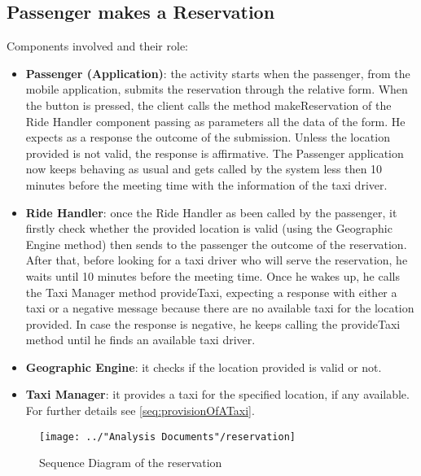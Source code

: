 \subsection{Passenger makes a Reservation}\label{seq:passengerMakesReservation}
Components involved and their role:
\begin{itemize}
	\item \textbf{Passenger (Application)}: the activity starts when the passenger, from the mobile application, submits the reservation through the relative form. When the button is pressed, the client calls the method makeReservation of the Ride Handler component passing as parameters all the data of the form. He expects as a response the outcome of the submission. Unless the location provided is not valid, the response is affirmative. The Passenger application now keeps behaving as usual and gets called by the system less then 10 minutes before the meeting time with the information of the taxi driver.
	\item \textbf{Ride Handler}: once the Ride Handler as been called by the passenger, it firstly check whether the provided location is valid (using the Geographic Engine method) then sends to the passenger the outcome of the reservation. After that, before looking for a taxi driver who will serve the reservation, he waits until 10 minutes before the meeting time. Once he wakes up, he calls the Taxi Manager method provideTaxi, expecting a response with either a taxi or a negative message because there are no available taxi for the location provided. In case the response is negative, he keeps calling the provideTaxi method until he finds an available taxi driver.
	\item \textbf{Geographic Engine}: it checks if the location provided is valid or not.
	\item \textbf{Taxi Manager}: it provides a taxi for the specified location, if any available. For further details see \ref{seq:provisionOfATaxi}.
\end{itemize}
\begin{figure}[H]
	\centering
	\texttt{[image: ../"Analysis Documents"/reservation]}
	\label{fig:reservation_seq}
	\caption{Sequence Diagram of the reservation}
\end{figure}

